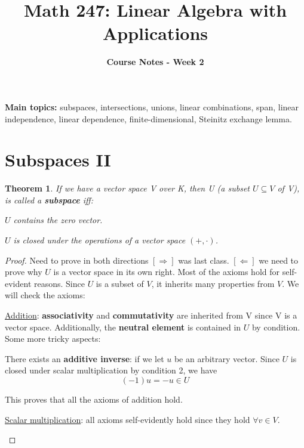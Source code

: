 \documentclass[a4paper, 12pt]{article}
\title{\textbf{Math 247: Linear Algebra with Applications} \vspace{-2ex}}
\author{\textbf{Course Notes - Week 2} \vspace{-2ex}}
\date{}
\newtheorem{theorem}{Theorem}
\renewcommand{\arraystretch}{1.0}
\theoremstyle{definition}
\theoremstyle{definition}
\theoremstyle{definition}
\theoremstyle{definition}
\newenvironment{enumerate_tight}{
	\begin{enumerate}
		\setlength{\itemsep}{0pt}
		\setlength{\parskip}{0pt}
	}{\end{enumerate}}
\newenvironment{itemize_tight}{
	\begin{itemize}
		\setlength{\itemsep}{0pt}
		\setlength{\parskip}{0pt}
	}{\end{itemize}}
\begin{document}
\maketitle

\pagestyle{fancy}
\rhead{}
\lfoot{}
\cfoot{}
\renewcommand{\headrulewidth}{0.4pt}
\renewcommand{\footrulewidth}{0.4pt}
\setlength{\tabcolsep}{0.5em} %
{\renewcommand{\arraystretch}{1.2}%
\textbf{Main topics:} subspaces, intersections, unions, linear combinations, span, linear independence, linear dependence, finite-dimensional, Steinitz exchange lemma.  
\section{Subspaces II}

\begin{theorem}
	If we have a vector space V over K, then U (a subset  $U \subseteq V$ of V), is called a \textbf{subspace} iff:
	\begin{enumerate_tight}
		\item $U$ contains the zero vector. 
		\item $U$ is closed under the operations of a vector space $(+, \cdot)$. 
	\end{enumerate_tight}
\end{theorem}
\begin{proof} Need to prove in both directions \newline \newline 
	$[ \Rightarrow ]$ was last class. \newline
	$[ \Leftarrow ]$ we need to prove why $U$ is a vector space in its own right. Most of the axioms hold for self-evident reasons. Since $U$ is a subset of $V$, it inherits many properties from $V$. We will check the axioms: 
	\begin{itemize_tight}
		\item \underline{Addition}: \textbf{associativity} and \textbf{commutativity} are inherited from V since V is a vector space. Additionally, the \textbf{neutral element} is contained in $U$ by condition. Some more tricky aspects: 
		\begin{itemize_tight}
			\item There exists an \textbf{additive inverse}: if we let $u$ be an arbitrary vector. Since $U$ is closed under scalar multiplication by condition 2, we have $$ (-1)u = -u \in U$$ 
			\item This proves that all the axioms of addition hold. 
		\end{itemize_tight} 
	\item \underline{Scalar multiplication}: all axioms self-evidently hold since they hold $\forall v \in V$. 
	\end{itemize_tight}
	

\end{proof}}
\end{document}
